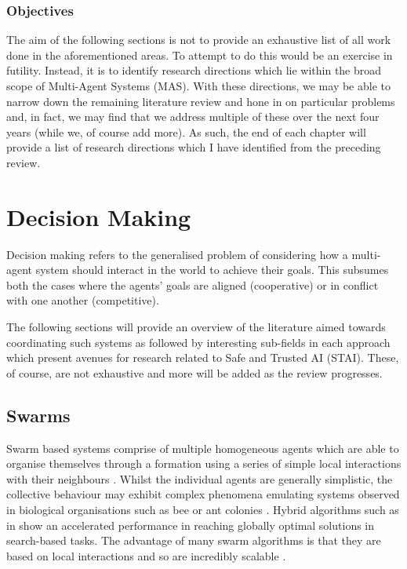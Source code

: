 \documentclass[preprint,11pt]{report}
\begin{document}
\subsection*{Objectives}

The aim of the following sections is not to provide an exhaustive list of all work done in the
aforementioned areas. To attempt to do this would be an exercise in futility. Instead, it is to
identify research directions which lie within the broad scope of Multi-Agent Systems (MAS). With
these directions, we may be able to narrow down the remaining literature review and hone in on
particular problems and, in fact, we may find that we address multiple of these over the next four
years (while we, of course add more). As such, the end of each chapter will provide a list of
research directions which I have identified from the preceding review. 

\chapter{Decision Making}

Decision making refers to the generalised problem of considering how a multi-agent system should
interact in the world to achieve their goals. This subsumes both the cases where the agents' goals
are aligned (cooperative) or in conflict with one another (competitive). 

The following sections will provide an overview of the literature aimed towards coordinating such
systems as followed by interesting sub-fields in each approach which present avenues for research
related to Safe and Trusted AI (STAI). These, of course, are not exhaustive and more will be added
as the review progresses.

\section{Swarms}

Swarm based systems comprise of multiple homogeneous agents which are able to organise themselves
through a formation using a series of simple local interactions with their neighbours
\cite{Couceiro2015}. Whilst the individual agents are generally simplistic, the collective behaviour
may exhibit complex phenomena emulating systems observed in biological organisations such as bee or
ant colonies \cite{Sethi2017}. Hybrid algorithms such as in \cite{Gao2018} show an accelerated
performance in reaching globally optimal solutions in search-based tasks. The advantage of many
swarm algorithms is that they are based on local interactions and so are incredibly scalable
\cite{Rizk2018}. 
\end{document}
